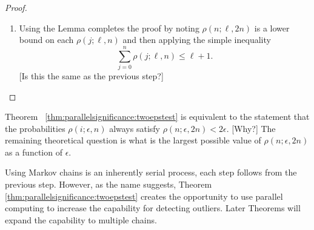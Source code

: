 \documentclass[12pt]{article}
\begin{document}
\begin{proof}
\begin{enumerate}
\[                {2n+1}.
              \]
              [Rewrite similar to Step 10 in Prop 1 in Serial Significance]
        \item
            Using the Lemma completes the proof by noting \( \rho(n;
            \ell, 2n) \) is a lower bound on each \( \rho(j; \ell, n) \)
            and then applying the simple inequality
            \begin{equation}
                \label{eq:parallelsignificance:eight} \sum\limits_{j=0}^n
                \rho(j; \ell, n) \le \ell + 1.
              \end{equation}
              [Is this the same as the previous step?]
    \end{enumerate}
\end{proof}

\begin{remark}
    Theorem~%
    \ref{thm:parallelsignificance:twoepstest} is equivalent to the
    statement that the probabilities \( \rho(i; \epsilon, n) \) always
    satisfy \( \rho(n; \epsilon, 2n) < 2\epsilon \).  [Why?] The
    remaining theoretical question is what is the largest possible value
    of \( \rho(n; \epsilon, 2n) \) as a function of \( \epsilon \).
\end{remark}

\begin{remark}
    Using Markov chains is an inherently serial process, each step
    follows from the previous step.  However, as the name suggests,
    Theorem~%
    \ref{thm:parallelsignificance:twoepstest} creates the opportunity to
    use parallel computing to increase the capability for detecting
    outliers.  Later Theorems will expand the capability to multiple
    chains.
\end{remark}
\end{document}

